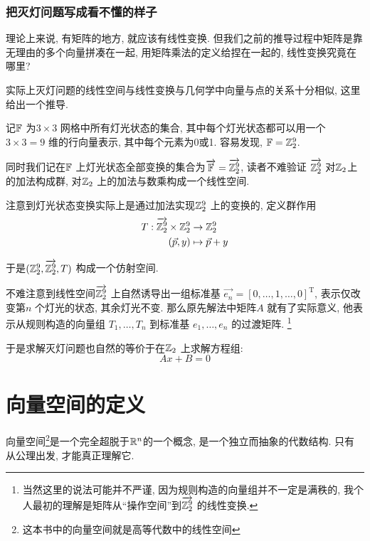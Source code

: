 \subsubsection{把灭灯问题写成看不懂的样子}

理论上来说, 有矩阵的地方, 就应该有线性变换. 但我们之前的推导过程中矩阵是靠无理由的多个向量拼凑在一起,
用矩阵乘法的定义给捏在一起的, 线性变换究竟在哪里?

实际上灭灯问题的线性空间与线性变换与几何学中向量与点的关系十分相似, 这里给出一个推导.

记\(\mathbb{F}\) 为\(3 \times 3\) 网格中所有灯光状态的集合,
其中每个灯光状态都可以用一个\(3 \times 3=9\) 维的行向量表示, 其中每个元素为0或1. 容易发现,
\(\mathbb{F}=\mathbb{Z}_{2}^{9}\).

同时我们记在\(\mathbb{F}\)
上灯光状态全部变换的集合为\(\overrightarrow{\mathbb{F}}=\overrightarrow{\mathbb{Z}_{2}^{9}}\),
读者不难验证 \(\overrightarrow{\mathbb{Z}_{2}^{9}}\)
对\(\mathbb{Z}_{2}\)上的加法构成群, 对\(\mathbb{Z}_{2}\) 上的加法与数乘构成一个线性空间.

注意到灯光状态变换实际上是通过加法实现\(\mathbb{Z}^{9}_{2}\) 上的变换的, 定义群作用
\begin{align*}
    T: \overrightarrow{\mathbb{Z}_{2}^{9}} \times
    \mathbb{Z}_{2}^{9} &\to \mathbb{Z}_{2}^{9}\\
    (\vec{p},y) &\mapsto \vec{p}+y
\end{align*}

于是\((\mathbb{Z}^{9}_{2},
\overrightarrow{\mathbb{Z}^{9}_{2}}, T)\) 构成一个仿射空间.

不难注意到线性空间\(\overrightarrow{\mathbb{Z}^{9}_{2}}\) 上自然诱导出一组标准基
\(\vec{e_{n}}=[0,\dots,1,\dots,0]^{\mathrm{T}}\),
表示仅改变第\(n\) 个灯光的状态, 其余灯光不变.  那么原先解法中矩阵\(A\) 就有了实际意义, 他表示从规则构造的向量组
\({T_{1}, \dots, T_{n}}\) 到标准基 \({e_{1}, \dots, e_{n}}\) 的过渡矩阵.
\footnote{当然这里的说法可能并不严谨, 因为规则构造的向量组并不一定是满秩的,
我个人最初的理解是矩阵从``操作空间''到\(\overrightarrow{\mathbb{Z}^{9}_{2}}\) 的线性变换.}

于是求解灭灯问题也自然的等价于在\(\mathbb{Z}_{2}\) 上求解方程组:
\[
    Ax+B=0
\]

\section{向量空间的定义}
向量空间\footnote{这本书中的向量空间就是高等代数中的线性空间}是一个完全超脱于\(\mathbb{R}^{n}\)的一个概念,
是一个独立而抽象的代数结构. 只有从公理出发, 才能真正理解它.

